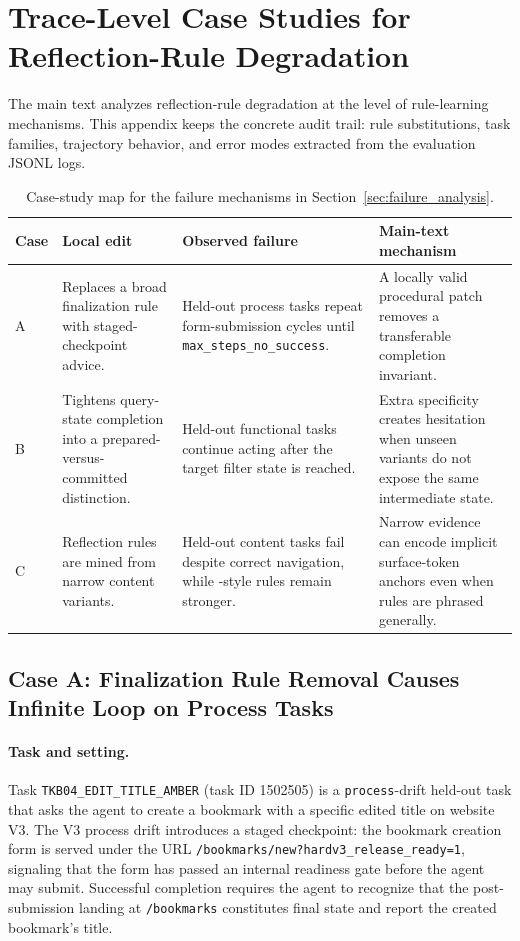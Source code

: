 \providecommand{\FloatBarrier}{\clearpage}

\section{Trace-Level Case Studies for Reflection-Rule Degradation}
\label{sec:case_studies}

The main text analyzes reflection-rule degradation at the level of rule-learning mechanisms. This appendix keeps the concrete audit trail: rule substitutions, task families, trajectory behavior, and error modes extracted from the evaluation JSONL logs.

\begin{table}[!htbp]
\centering
\caption{Case-study map for the failure mechanisms in Section~\ref{sec:failure_analysis}.}
\label{tab:failure_case_map}
\small
\begin{tabular}{p{2.0cm}p{3.7cm}p{4.5cm}p{3.6cm}}
\toprule
Case & Local edit & Observed failure & Main-text mechanism \\
\midrule
A & Replaces a broad finalization rule with staged-checkpoint advice. & Held-out process tasks repeat form-submission cycles until \texttt{max\_steps\_no\_success}. & A locally valid procedural patch removes a transferable completion invariant. \\
B & Tightens query-state completion into a prepared-versus-committed distinction. & Held-out functional tasks continue acting after the target filter state is reached. & Extra specificity creates hesitation when unseen variants do not expose the same intermediate state. \\
C & Reflection rules are mined from narrow content variants. & Held-out content tasks fail despite correct navigation, while \expel{}-style rules remain stronger. & Narrow evidence can encode implicit surface-token anchors even when rules are phrased generally. \\
\bottomrule
\end{tabular}
\end{table}

\subsection{Case A: Finalization Rule Removal Causes Infinite Loop on Process Tasks}

\paragraph{Task and setting.}
Task \texttt{TKB04\_EDIT\_TITLE\_AMBER} (task ID 1502505) is a \texttt{process}-drift held-out task that asks the agent to create a bookmark with a specific edited title on website V3. The V3 process drift introduces a staged checkpoint: the bookmark creation form is served under the URL \texttt{/bookmarks/new?hardv3\_release\_ready=1}, signaling that the form has passed an internal readiness gate before the agent may submit. Successful completion requires the agent to recognize that the post-submission landing at \texttt{/bookmarks} constitutes final state and report the created bookmark's title.

